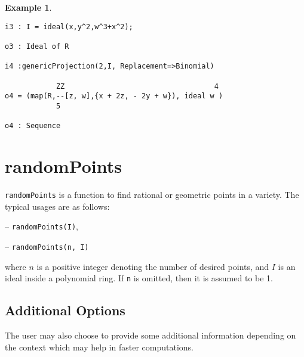 \documentclass[11pt]{amsart}
\theoremstyle{definition}
\newtheorem{example}{Example}[section]
\begin{document}
\begin{enumerate}
\begin{example}
{{\begin{verbatim}
i3 : I = ideal(x,y^2,w^3+x^2);

o3 : Ideal of R

i4 :genericProjection(2,I, Replacement=>Binomial)

            ZZ                                   4
o4 = (map(R,--[z, w],{x + 2z, - 2y + w}), ideal w )                                     
            5

o4 : Sequence
\end{verbatim}
}}
\end{example}

\end{enumerate}
\section{randomPoints}\label{randomPoints}
{\tt randomPoints} is a function to find rational or geometric points in a variety. The typical usages are as follows: 

\vspace{1em}
-- {\tt randomPoints(I)}, 

-- {\tt randomPoints(n, I)} 

\vspace{1em}
\noindent where $n$ is a positive integer denoting the number of desired points, and 
$I$ is an ideal inside a polynomial ring.  If {\tt n} is omitted, then it is assumed to be 1.


\subsection{Additional Options}\label{strategydetails}

The user may also choose to provide some additional information depending on the context which may help in faster computations. 
\end{document}
